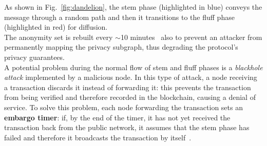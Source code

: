 \documentclass[conference]{IEEEtran}
\begin{document}
As shown in Fig.~\ref{fig:dandelion}, the stem phase (highlighted in blue) conveys the message through a random path and then it transitions to the fluff phase (highlighted in red) for diffusion.\\
The anonymity set is rebuilt every $\sim$10 minutes~\cite{dandelion_plus_plus} also to prevent an attacker from permanently mapping the privacy subgraph, thus degrading the protocol's privacy guarantees.\\
A potential problem during the normal flow of stem and fluff phases is a \textit{blackhole attack} implemented by a malicious node. In this type of attack, a node receiving a transaction discards it instead of forwarding it: this prevents the transaction from being verified and therefore recorded in the blockchain, causing a denial of service. To solve this problem, each node forwarding the transaction sets an \textbf{embargo timer}: if, by the end of the timer, it has not yet received the transaction back from the public network, it assumes that the stem phase has failed and therefore it broadcasts the transaction by itself~\cite{dandelion_plus_plus}.
\end{document}
